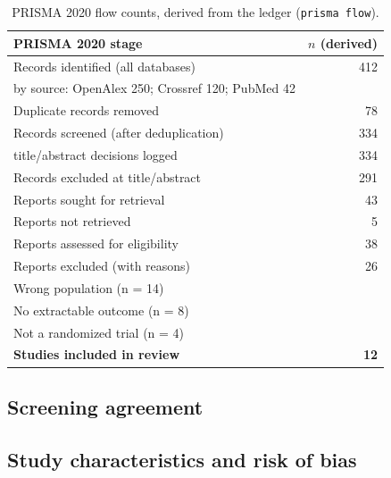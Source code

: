 \documentclass[12pt,a4paper]{article}
\newcommand{\prismaIdentified}{412}          %
\newcommand{\prismaIdentifiedBySource}{%
    OpenAlex 250; Crossref 120; PubMed 42}   %
\newcommand{\prismaDuplicates}{78}           %
\newcommand{\prismaAfterDedup}{334}          %
\newcommand{\prismaScreened}{334}            %
\newcommand{\prismaRecExcluded}{291}         %
\newcommand{\prismaReportsSought}{43}        %
\newcommand{\prismaReportsNotRetrieved}{5}   %
\newcommand{\prismaReportsAssessed}{38}      %
\newcommand{\prismaReportsExcluded}{26}      %
\newcommand{\prismaIncluded}{12}             %
\newcommand{\prismaReasonOne}{Wrong population (n = 14)}
\newcommand{\prismaReasonTwo}{No extractable outcome (n = 8)}
\newcommand{\prismaReasonThree}{Not a randomized trial (n = 4)}
\begin{document}
\begin{table}[htbp]
\centering
\caption{PRISMA 2020 flow counts, derived from the ledger (\texttt{prisma flow}).}
\label{tab:prisma-flow}
\begin{tabular}{@{}l r@{}}
\toprule
\textbf{PRISMA 2020 stage} & \textbf{$n$ (derived)} \\
\midrule
Records identified (all databases)        & \prismaIdentified \\
\quad by source: \prismaIdentifiedBySource & \\
Duplicate records removed                 & \prismaDuplicates \\
Records screened (after deduplication)    & \prismaAfterDedup \\
\quad title/abstract decisions logged     & \prismaScreened \\
Records excluded at title/abstract        & \prismaRecExcluded \\
Reports sought for retrieval              & \prismaReportsSought \\
Reports not retrieved                     & \prismaReportsNotRetrieved \\
Reports assessed for eligibility          & \prismaReportsAssessed \\
Reports excluded (with reasons)           & \prismaReportsExcluded \\
\quad \prismaReasonOne                     & \\
\quad \prismaReasonTwo                     & \\
\quad \prismaReasonThree                   & \\
\textbf{Studies included in review}       & \textbf{\prismaIncluded} \\
\bottomrule
\end{tabular}
\end{table}

\subsection{Screening agreement}

\subsection{Study characteristics and risk of bias}
\end{document}
